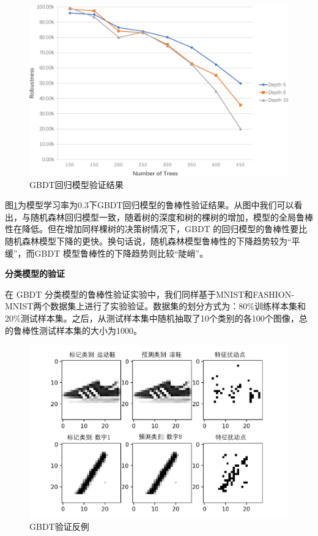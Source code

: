 \begin{figure}[!hbt]
\centering
	\includegraphics[scale=0.65]{fig2/C5/gb/gb_regression.pdf}
	\caption{GBDT回归模型验证结果}
	\label{fig:GBDT回归验证}	
\end{figure}

图\ref{fig:GBDT回归验证}为模型学习率为0.3下GBDT回归模型的鲁棒性验证结果。从图中我们可以看出，与随机森林回归模型一致，随着树的深度和树的棵树的增加，模型的全局鲁棒性在降低。但在增加同样棵树的决策树情况下，GBDT 的回归模型的鲁棒性要比随机森林模型下降的更快。换句话说，随机森林模型鲁棒性的下降趋势较为“平缓”，而GBDT 模型鲁棒性的下降趋势则比较“陡峭”。

\textbf{分类模型的验证}

在 GBDT 分类模型的鲁棒性验证实验中，我们同样基于MNIST和FASHION-MNIST两个数据集上进行了实验验证。数据集的划分方式为：80$\%$训练样本集和20$\%$测试样本集。之后，从测试样本集中随机抽取了10个类别的各100个图像，总的鲁棒性测试样本集的大小为1000。

\begin{figure}[!hbt]
\centering
	\includegraphics[scale=0.7]{fig2/C5/gb/gb_ad.pdf}
	\caption{GBDT验证反例}
	\label{fig:GBDT验证反例}	
\end{figure}

